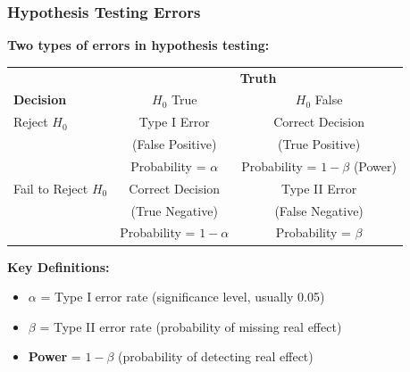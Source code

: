 \documentclass{beamer}
\begin{document}
\begin{frame}
\frametitle{Hypothesis Testing Errors}
\textbf{Two types of errors in hypothesis testing:}

\vspace{0.3cm}
\begin{center}
\begin{tabular}{l|cc}
\toprule
 & \multicolumn{2}{c}{\textbf{Truth}} \\
\textbf{Decision} & $H_0$ True & $H_0$ False \\
\midrule
Reject $H_0$ & Type I Error & Correct Decision \\
 & (False Positive) & (True Positive) \\
 & Probability = $\alpha$ & Probability = $1-\beta$ (Power) \\
\midrule
Fail to Reject $H_0$ & Correct Decision & Type II Error \\
 & (True Negative) & (False Negative) \\
 & Probability = $1-\alpha$ & Probability = $\beta$ \\
\bottomrule
\end{tabular}
\end{center}

\vspace{0.5cm}
\textbf{Key Definitions:}
\begin{itemize}
\item $\alpha$ = Type I error rate (significance level, usually 0.05)
\item $\beta$ = Type II error rate (probability of missing real effect)
\item \textbf{Power} = $1 - \beta$ (probability of detecting real effect)
\end{itemize}
\end{frame}
\end{document}

